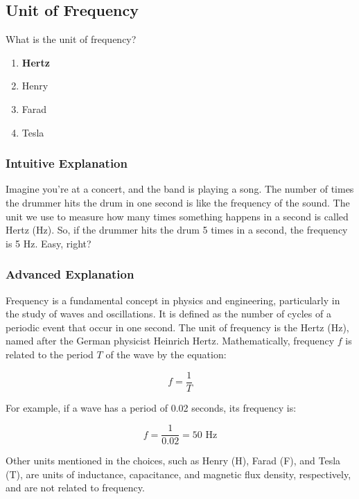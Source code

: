 \subsection{Unit of Frequency}
\label{T5A06}

\begin{tcolorbox}[colback=gray!10!white,colframe=black!75!black,title=T5A06]
What is the unit of frequency?
\begin{enumerate}[label=\Alph*)]
    \item \textbf{Hertz}
    \item Henry
    \item Farad
    \item Tesla
\end{enumerate}
\end{tcolorbox}

\subsubsection{Intuitive Explanation}
Imagine you're at a concert, and the band is playing a song. The number of times the drummer hits the drum in one second is like the frequency of the sound. The unit we use to measure how many times something happens in a second is called Hertz (Hz). So, if the drummer hits the drum 5 times in a second, the frequency is 5 Hz. Easy, right?

\subsubsection{Advanced Explanation}
Frequency is a fundamental concept in physics and engineering, particularly in the study of waves and oscillations. It is defined as the number of cycles of a periodic event that occur in one second. The unit of frequency is the Hertz (Hz), named after the German physicist Heinrich Hertz. Mathematically, frequency \( f \) is related to the period \( T \) of the wave by the equation:

\[
f = \frac{1}{T}
\]

For example, if a wave has a period of 0.02 seconds, its frequency is:

\[
f = \frac{1}{0.02} = 50 \text{ Hz}
\]

Other units mentioned in the choices, such as Henry (H), Farad (F), and Tesla (T), are units of inductance, capacitance, and magnetic flux density, respectively, and are not related to frequency.

